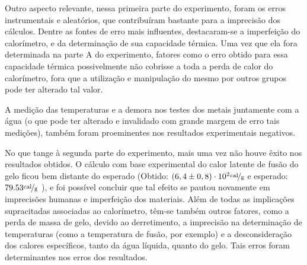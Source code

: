 \documentclass[a4paper]{article}
\begin{document}
            Outro aspecto relevante, nessa primeira parte do experimento, foram os 
            erros instrumentais e aleatórios, que contribuíram bastante para a imprecisão dos 
            cálculos. Dentre as fontes de erro mais influentes, destacaram-se a imperfeição do 
            calorímetro, e da determinação de sua capacidade térmica. Uma vez que ela fora 
            determinada na parte A do experimento, fatores como o erro obtido para essa 
            capacidade térmica possivelmente não cobrisse a toda a perda de calor do calorímetro, 
            fora que a utilização e manipulação do mesmo por outros grupos pode ter alterado 
            tal valor. 
            
            A medição das temperaturas e a demora nos testes dos metais 
            juntamente com a água (o que pode ter alterado e invalidado com grande margem 
            de erro tais medições), também foram proeminentes nos resultados experimentais 
            negativos.
            
            No que tange à segunda parte do experimento, mais uma vez não houve 
            êxito nos resultados obtidos. O cálculo com base experimental do calor latente de 
            fusão do gelo ficou bem distante do esperado
            (Obtido: $\left(6,4\pm0,8\right)\cdot10^{2}\unitfrac{cal}{g}$ e
             esperado: $79.53\unitfrac{cal}{g}$ ), e foi 
            possível concluir que tal efeito se pautou novamente em imprecisões humanas e 
            imperfeição dos materiais. Além de todas as implicações supracitadas associadas 
            ao calorímetro, têm-se também outros fatores, como a perda de massa de gelo, 
            devido ao derretimento, a imprecisão na determinação de temperaturas (como a 
            temperatura de fusão, por exemplo) e a desconsideração dos calores específicos, 
            tanto da água líquida, quanto do gelo. Tais erros foram determinantes nos erros 
            dos resultados.
\end{document}
